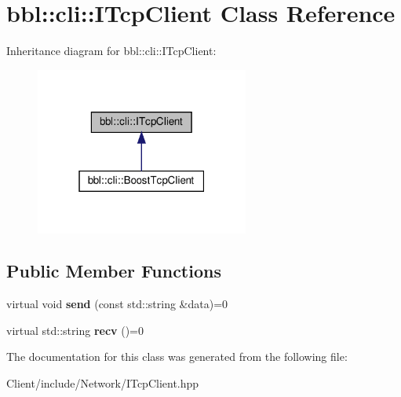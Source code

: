 \hypertarget{classbbl_1_1cli_1_1_i_tcp_client}{}\section{bbl\+:\+:cli\+:\+:I\+Tcp\+Client Class Reference}
\label{classbbl_1_1cli_1_1_i_tcp_client}


Inheritance diagram for bbl\+:\+:cli\+:\+:I\+Tcp\+Client\+:
\nopagebreak
\begin{figure}[H]
\begin{center}
\leavevmode
\includegraphics[width=199pt]{classbbl_1_1cli_1_1_i_tcp_client__inherit__graph}
\end{center}
\end{figure}
\subsection*{Public Member Functions}
\begin{DoxyCompactItemize}
\item 
\mbox{\label{classbbl_1_1cli_1_1_i_tcp_client_a46cc16cc1a32f452aeafa26aae911748}} 
virtual void {\bfseries send} (const std\+::string \&data)=0
\item 
\mbox{\label{classbbl_1_1cli_1_1_i_tcp_client_a3c849d6c7f7800d4c8fdacef36800ab6}} 
virtual std\+::string {\bfseries recv} ()=0
\end{DoxyCompactItemize}


The documentation for this class was generated from the following file\+:\begin{DoxyCompactItemize}
\item 
Client/include/\+Network/I\+Tcp\+Client.\+hpp\end{DoxyCompactItemize}
